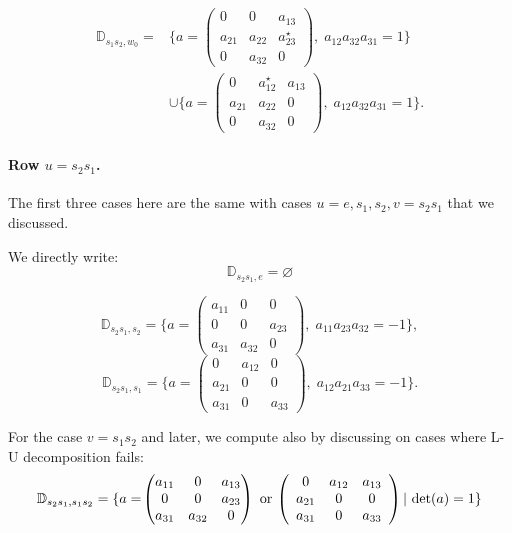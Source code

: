 \documentclass[12pt]{amsart}
\newcommand{\D}{\mathbb D}
\theoremstyle{plain}
\theoremstyle{definition}
\theoremstyle{remark}
\begin{document}
\[
\begin{aligned}
\D_{s_1s_2,w_0}
={}&
\{a=\!\left(
\begin{array}{ccc}
0&0&a_{13}\\
a_{21}&a_{22}&a_{23}^\star\\
0&a_{32}&0
\end{array}
\right)\!,\;a_{12}a_{32}a_{31}=1\}\\
&\cup
\{a=\!\left(
\begin{array}{ccc}
0&a_{12}^\star&a_{13}\\
a_{21}&a_{22}&0\\
0&a_{32}&0
\end{array}
\right)\!,\;a_{12}a_{32}a_{31}=1\}.
\end{aligned}
\]



\paragraph{\bf Row \(u=s_2s_1\).}
The first three cases here are the same with cases $u=e,s_1,s_2, v=s_2s_1$ that we discussed.

We directly write:
\[
\D_{s_2s_1,e}=\varnothing
\]

\[
\D_{s_2s_1,s_2}
=\{a=\!\left(
\begin{array}{ccc}
a_{11}&0&0\\
0&0&a_{23}\\
a_{31}&a_{32}&0
\end{array}
\right)\!,\;a_{11}a_{23}a_{32}=-1\},
\]
\[
\D_{s_2s_1,s_1}
=\{a=\!\left(
\begin{array}{ccc}
0&a_{12}&0\\
a_{21}&0&0\\
a_{31}&0&a_{33}
\end{array}
\right)\!,\;a_{12}a_{21}a_{33}=-1\}.
\]

For the case $v=s_1s_2$ and later, we compute also by discussing on cases where L-U decomposition fails:\[
\D_{s_2s_1,s_1s_2}
=\{a=\!
\begin{pmatrix}
a_{11}&0&a_{13} \\
0&0&a_{23} \\
a_{31}&a_{32}&0
\end{pmatrix}
\textup{ or }\!\left(
\begin{array}{ccc}
0&a_{12}&a_{13}\\
a_{21}&0&0\\
a_{31}&0&a_{33}
\end{array}
\right)| \textup{ det}(a)=1\}
\]
\end{document}
